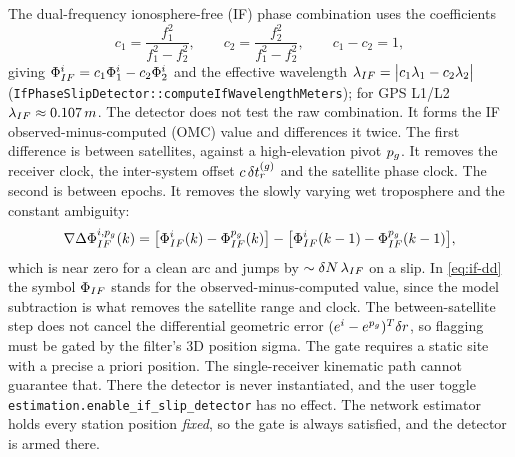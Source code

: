 \documentclass[main.tex]{subfiles}
\begin{document}
The dual-frequency ionosphere-free (IF) phase combination uses the
coefficients
\begin{equation}
c_1 = \frac{f_1^{2}}{f_1^{2} - f_2^{2}},
\qquad
c_2 = \frac{f_2^{2}}{f_1^{2} - f_2^{2}},
\qquad
c_1 - c_2 = 1,
\label{eq:if-coeffs}
\end{equation}
giving $\Phi^i_{IF} = c_1 \Phi^i_1 - c_2
\Phi^i_2$ and the effective wavelength $\lambda_{IF} = \bigl|c_1
\lambda_1 - c_2 \lambda_2\bigr|$
(\texttt{IfPhaseSlipDetector::computeIfWavelengthMeters}); for GPS L1/L2
$\lamif \approx \SI{0.107}{m}$.  The detector does not test the raw
combination.  It forms the IF observed-minus-computed (OMC) value and
differences it twice.  The first difference is between satellites,
against a high-elevation pivot $p_{g}$.  It removes the receiver
clock, the inter-system offset $c\,\delta t^{(g)}_r$ and the
satellite phase clock.  The second is between epochs.  It removes the
slowly varying wet troposphere and the constant ambiguity:
\begin{equation}
\nabla\Delta \Phi^{i,p_{g}}_{IF}(k)
=
\bigl[\Phi^i_{IF}(k) - \Phi^{p_{g}}_{IF}(k)\bigr]
-
\bigl[\Phi^i_{IF}(k-1) - \Phi^{p_{g}}_{IF}(k-1)\bigr],
\label{eq:if-dd}
\end{equation}
which is near zero for a clean arc and jumps by $\sim \delta N\,\lambda_{IF}$
on a slip.  In \eqref{eq:if-dd} the symbol $\Phi_{IF}$ stands
for the observed-minus-computed value, since the model subtraction is what
removes the satellite range and clock.  The between-satellite step does not
cancel the differential geometric error
$(e^i - e^{p_{g}})^{T} \delta r$, so flagging must be gated
by the filter's 3D position sigma.  The gate requires a static site with a
precise a priori position.  The single-receiver kinematic path cannot
guarantee that.  There the detector is never instantiated, and the user
toggle \texttt{estimation.enable\_if\_slip\_detector} has no effect.  The
network estimator holds every station position \emph{fixed}, so the gate
is always satisfied, and the detector is armed there.
\end{document}
